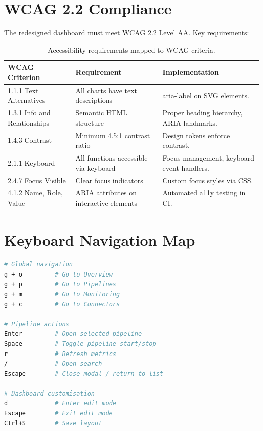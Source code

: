 \documentclass[
    language=english,
    doctype=technical-report,
    institution=none,
    titlestyle=book,
    oneside,
]{../../omnilatex}
\begin{document}
\section{WCAG 2.2 Compliance}

The redesigned dashboard must meet WCAG 2.2 Level AA. Key requirements:

\begin{table}[htbp]
    \centering
    \caption{Accessibility requirements mapped to WCAG criteria.}
    \label{tab:accessibility}
    \begin{tabular}{@{}lp{5cm}p{5cm}@{}}
        \toprule
        WCAG Criterion & Requirement & Implementation \\
        \midrule
        1.1.1 Text Alternatives & All charts have text descriptions &
            aria-label on SVG elements. \\
        1.3.1 Info and Relationships & Semantic HTML structure &
            Proper heading hierarchy, ARIA landmarks. \\
        1.4.3 Contrast & Minimum 4.5:1 contrast ratio & Design tokens
            enforce contrast. \\
        2.1.1 Keyboard & All functions accessible via keyboard &
            Focus management, keyboard event handlers. \\
        2.4.7 Focus Visible & Clear focus indicators & Custom focus
            styles via CSS. \\
        4.1.2 Name, Role, Value & ARIA attributes on interactive
            elements & Automated a11y testing in CI. \\
        \bottomrule
    \end{tabular}
\end{table}

\section{Keyboard Navigation Map}

\begin{lstlisting}[language=bash, caption={Dashboard keyboard shortcuts.}]
# Global navigation
g + o         # Go to Overview
g + p         # Go to Pipelines
g + m         # Go to Monitoring
g + c         # Go to Connectors

# Pipeline actions
Enter         # Open selected pipeline
Space         # Toggle pipeline start/stop
r             # Refresh metrics
/             # Open search
Escape        # Close modal / return to list

# Dashboard customisation
d             # Enter edit mode
Escape        # Exit edit mode
Ctrl+S        # Save layout
\end{lstlisting}
\end{document}

